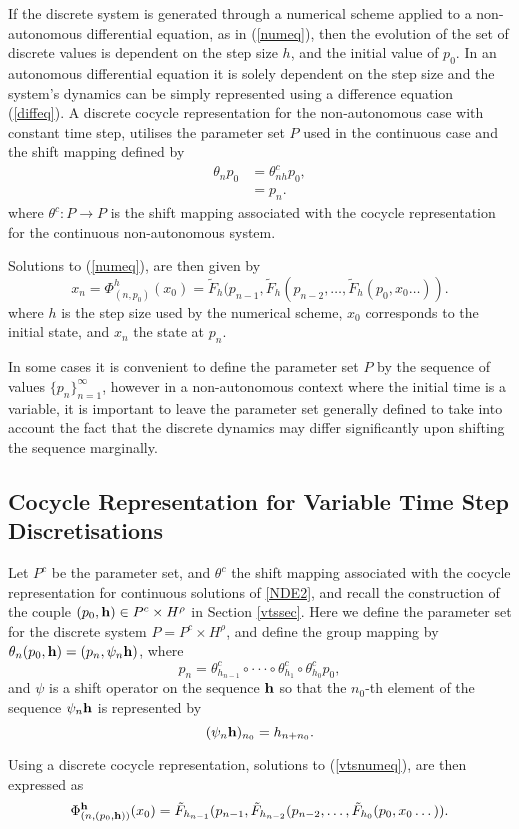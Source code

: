 If the discrete system is generated through a numerical scheme
applied to a non-autonomous differential equation, as in
(\ref{numeq}), then the evolution of the set of discrete values is
dependent on the step size $h$, and the initial value of $p_0$. In
an autonomous differential equation it is solely dependent on the
step size and the system's dynamics can be simply represented
using a difference equation (\ref{diffeq}). A discrete cocycle
representation for the non-autonomous case with constant time
step, utilises the parameter set $P$ used in the continuous case
and the shift mapping defined by
\begin{align*}
  \theta_n p_0 &= \theta^c_{nh} p_0, \\
  &= p_n.
\end{align*}
where $\theta^c: P \to P$ is the shift mapping associated with the cocycle
representation for the continuous non-autonomous system.

Solutions to (\ref{numeq}), are then given by
\begin{equation}
\label{drepeq}
  x_n = \Phi^h_{(n,p_0)}(x_0) =
        \tilde{F}_{h}(p_{n-1},\tilde{F}_{h}(p_{n-2}, \dots
        , \tilde{F}_{h}(p_{0},x_{0} \dots)).
\end{equation}
where $h$ is the step size used by the numerical scheme, $x_0$
corresponds to the initial state, and $x_n$ the state at $p_n$.

In some cases it is convenient to define the parameter set $P$ by
the sequence of values $\{ p_n \}_{n=1}^{\infty}$, however in a
non-autonomous context where the initial time is a variable, it is
important to leave the parameter set generally defined to take
into account the fact that the discrete dynamics may differ
significantly upon shifting the sequence marginally.

\subsection{Cocycle Representation for Variable Time Step Discretisations}
\label{ssecvarstep}

Let $P^c$ be the parameter set, and $\theta^c$ the shift mapping associated with
the cocycle representation for continuous solutions of \ref{NDE2}, and
recall the construction of the couple $(p_0, {\bf h}) \in P^c
\times H^{\rho}$ in Section \ref{vtssec}. Here we define the parameter set for
the discrete system $P = P^c \times H^{\rho}$,
and define the group mapping by $\theta_n (p_0, {\bf h})
= (p_n, \psi_n {\bf h})$, where
\[ p_n = \theta^c_{h_{n-1}} \circ \cdot \cdot \cdot \circ \theta^c_{h_1}
         \circ \theta^c_{h_0} p_0, \]
and $\psi$ is a shift operator on the sequence ${\bf h}$ so that the $n_0$-th
element of the sequence $\psi_n {\bf h}$ is represented by
\[ (\psi_n{\bf  h})_{n_0} = h_{n + n_0}. \]

Using a discrete cocycle representation, solutions to (\ref{vtsnumeq}), are
then expressed as
\begin{equation}
\label{vtsdrepeq}
  \Phi^{{\bf h}}_{(n,(p_0,{\bf h}))}(x_0) =
        \tilde{F}_{h_{n-1}}(p_{n-1},\tilde{F}_{h_{n-2}}(p_{n-2}, \dots
        , \tilde{F}_{h_0}(p_{0},x_{0} \dots)).
\end{equation}

\endinput
